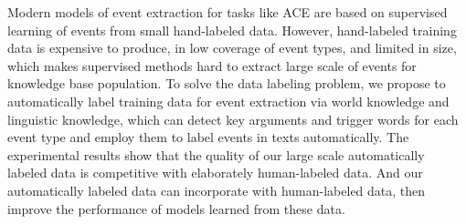 Modern models of event extraction for tasks like ACE are based on supervised learning of events from small hand-labeled data. However, hand-labeled training data is expensive to produce, in low coverage of event types, and limited in size, which makes supervised methods hard to extract large scale of events for knowledge base population. To solve the data labeling problem, we propose to automatically label training data for event extraction via world knowledge and linguistic knowledge, which can detect key arguments and trigger words for each event type and employ them to label events in texts automatically. The experimental results show that the quality of our large scale automatically labeled data is competitive with elaborately human-labeled data. And our automatically labeled data can incorporate with human-labeled data, then improve the performance of models learned from these data.
